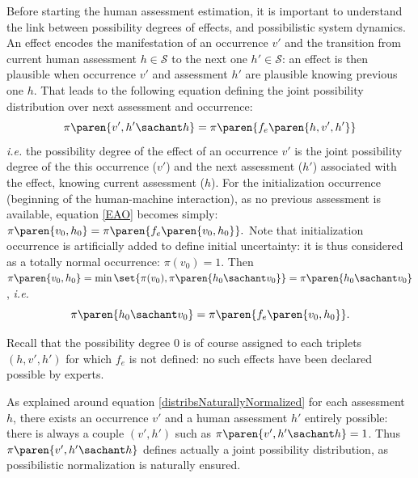 Before starting the human assessment estimation, 
it is important to understand the link between 
possibility degrees of effects, 
and possibilistic system dynamics. 
An effect encodes the manifestation of an occurrence $v'$
and the transition from current human assessment $h \in \mathcal{S}$ 
to the next one $h' \in \mathcal{S}$: 
an effect is then plausible 
when occurrence $v'$ and assessment $h'$ are plausible 
knowing previous one $h$. 
That leads to the following equation 
defining the joint possibility distribution 
over next assessment and occurrence:
\begin{equation}
\pi \paren{ v', h' \sachant h } = \pi \paren{ f_e \paren{ h,v',h' } }
\label{EAO}
\end{equation}
\textit{i.e.} the possibility degree of the effect of an occurrence $v'$ 
is the joint possibility degree of the this occurrence ($v'$) 
and the next assessment ($h'$) associated with the effect, 
knowing current assessment ($h$).
For the initialization occurrence (beginning of the human-machine interaction), 
as no previous assessment is available, 
equation \ref{EAO} becomes simply:
$\pi \paren{ v_0, h_0} = \pi \paren{ f_e \paren{ v_0,h_0 } }.$
Note that initialization occurrence is artificially added to define initial uncertainty: 
it is thus considered as a totally normal occurrence: $\pi(v_0) = 1$.
Then $ \pi \paren{ v_0, h_0} = \min \set{ \pi(v_0), \pi \paren{ h_0 \sachant v_0 } } = \pi \paren{ h_0 \sachant v_0 }$, \textit{i.e.}
\begin{equation}
\label{EAOinit} \pi \paren{ h_0 \sachant v_0} = \pi \paren{ f_e \paren{ v_0,h_0 } }.
\end{equation}

Recall that the possibility degree $0$ is of course assigned 
to each triplets $(h,v',h')$ for which 
$f_e$ is not defined: 
no such effects have been declared possible by experts.

As explained around equation \ref{distribsNaturallyNormalized} 
for each assessment $h$, 
there exists an occurrence $v'$ 
and a human assessment $h'$
entirely possible:
there is always a couple $(v',h')$ 
such as $\pi \paren{ v', h' \sachant h } = 1$.
Thus $\pi \paren{ v', h' \sachant h }$ 
defines actually a joint possibility distribution,
as possibilistic normalization is naturally ensured.

